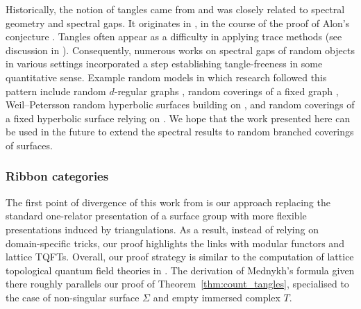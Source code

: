 \documentclass{amsart}
\begin{document}
Historically, the notion of tangles came from and was closely related to spectral geometry and spectral gaps. It originates in \cite[\S4]{pf_alon_2nd_eval_conj_related_problems_Friedman08}, in the course of the proof of Alon's conjecture \cite[Conjecture 5.1]{evals_expanders_Alon86}. Tangles often appear as a difficulty in applying trace methods (see discussion in \cites[\S2]{pf_alon_2nd_eval_conj_related_problems_Friedman08}[\S2.5]{spectral_gap_random_hyp_surfaces_AnantharamanMonk24}). Consequently, numerous works on spectral gaps of random objects in various settings incorporated a step establishing tangle-freeness in some quantitative sense. Example random models in which research followed this pattern include random $d$-regular graphs \cites{pf_alon_2nd_eval_conj_related_problems_Friedman08}{Ramanujan_prop_edge_universality_random_regular_graphs_HuangMcKenzieYau25}, random coverings of a fixed graph \cite{eigenvals_random_lifts_polys_random_permutation_matrices_BordenaveCollins19}, Weil--Petersson random hyperbolic surfaces \cite{FriedmanRamanujan_fns_random_hyp_geo_application_spectral_gaps_2_AnantharamanMonk25} building on \cite{Moebius_inversion_formula_discard_tangled_hyp_surfaces_AnantharamanMonk24}, and random coverings of a fixed hyperbolic surface \cite{random_cover_of_cpct_hyp_surface_has_relative_spectral_gap_316-eps_MageeNaudPuder22} relying on \cite{asymptotic_stats_random_covering_surfaces_MageePuder23}. We hope that the work presented here can be used in the future to extend the spectral results to random branched coverings of surfaces.

\subsubsection{Ribbon categories}

The first point of divergence of this work from \cite{asymptotic_stats_random_covering_surfaces_MageePuder23} is our approach replacing the standard one-relator presentation of a surface group with more flexible presentations induced by triangulations. As a result, instead of relying on domain-specific tricks, our proof highlights the links with modular functors and lattice TQFTs. Overall, our proof strategy is similar to the computation of lattice topological quantum field theories in \cite{mednykh_formula_lattice_tqfts_Snyder17}. The derivation of Mednykh's formula given there roughly parallels our proof of Theorem~\ref{thm:count_tangles}, specialised to the case of non-singular surface $\Sigma$ and empty immersed complex $T$.
\end{document}
